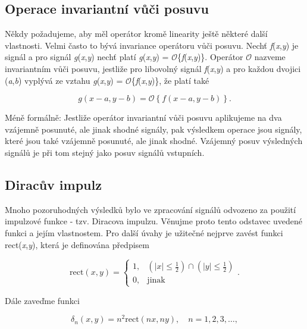 \subsection*{Operace invariantní vůči posuvu}

Někdy požadujeme, aby měl operátor kromě linearity ještě některé další vlastnosti. Velmi často to bývá invariance operátoru vůči posuvu. Nechť \textit{f}(\textit{x},\textit{y}) je signál a pro signál \textit{g}(\textit{x},\textit{y}) nechť platí \textit{g}(\textit{x},\textit{y}) = $\mathscr{O}$\{\textit{f}(\textit{x},\textit{y})\}. Operátor $\mathscr{O}$ nazveme invariantním vůči posuvu, jestliže pro libovolný signál \textit{f}(\textit{x},\textit{y}) a pro každou dvojici (\textit{a},\textit{b}) vyplývá ze vztahu \textit{g}(\textit{x},\textit{y}) = $\mathscr{O}$\{\textit{f}(\textit{x},\textit{y})\}, že platí také

\begin{equation} \label{eq:1_39}
    g(x-a, y-b) = \mathscr{O}\left\{ f(x-a, y-b) \right\}.
\end{equation}

Méně formálně: Jestliže operátor invariantní vůči posuvu aplikujeme na dva vzájemně posunuté, ale jinak shodné signály, pak výsledkem operace jsou signály, které jsou také vzájemně posunuté, ale jinak shodné. Vzájemný posuv výsledných signálů je při tom stejný jako posuv signálů vstupních.

\subsection*{Diracův impulz}

Mnoho pozoruhodných výsledků bylo ve zpracování signálů odvozeno za použití impulzové funkce - tzv. Diracova impulzu. Věnujme proto tento odstavec uvedené funkci a jejím vlastnostem. Pro další úvahy je užitečné nejprve zavést funkci rect(\textit{x},\textit{y}), která je definována předpisem

\begin{equation} \label{eq:1_40}
    \mathrm{rect}(x, y) = \left\{
    \begin{array}{cc}
    1, & \left( |x| \leq \frac{1}{2} \right) \cap \left( |y| \leq \frac{1}{2} \right) \\
    0, & \mathrm{jinak}
    \end{array} \right. .
\end{equation}

Dále zaveďme funkci

\begin{equation} \label{eq:1_41}
    \delta_n(x, y) = n^2 \mathrm{rect}(nx, ny), \quad n = 1, 2, 3, \dots ,
\end{equation}

